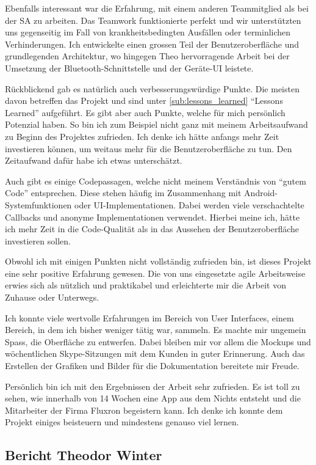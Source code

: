 Ebenfalls interessant war die Erfahrung, mit einem anderen Teammitglied als bei der SA zu arbeiten. Das Teamwork funktionierte perfekt und wir unterstützten uns gegenseitig im Fall von krankheitsbedingten Ausfällen oder terminlichen Verhinderungen. Ich entwickelte einen grossen Teil der Benutzeroberfläche und grundlegenden Architektur, wo hingegen Theo hervorragende Arbeit bei der Umsetzung der Bluetooth-Schnittstelle und der Geräte-UI leistete.

Rückblickend gab es natürlich auch verbesserungswürdige Punkte. Die meisten davon betreffen das Projekt und sind unter \ref{sub:lessons_learned} \enquote{Lessons Learned} aufgeführt. Es gibt aber auch Punkte, welche für mich persönlich Potenzial haben. So bin ich zum Beispiel nicht ganz mit meinem Arbeitsaufwand zu Beginn des Projektes zufrieden. Ich denke ich hätte anfangs mehr Zeit investieren können, um weitaus mehr für die Benutzeroberfläche zu tun. Den Zeitaufwand dafür habe ich etwas unterschätzt.

Auch gibt es einige Codepassagen, welche nicht meinem Verständnis von \enquote{gutem Code} entsprechen. Diese stehen häufig im Zusammenhang mit Android-Systemfunktionen oder UI-Implementationen. Dabei werden viele verschachtelte Callbacks und anonyme Implementationen verwendet. Hierbei meine ich, hätte ich mehr Zeit in die Code-Qualität als in das Aussehen der Benutzeroberfläche investieren sollen.

Obwohl ich mit einigen Punkten nicht vollständig zufrieden bin, ist dieses Projekt eine sehr positive Erfahrung gewesen. Die von uns eingesetzte agile Arbeitsweise erwies sich als nützlich und praktikabel und erleichterte mir die Arbeit von Zuhause oder Unterwegs.

Ich konnte viele wertvolle Erfahrungen im Bereich von User Interfaces, einem Bereich, in dem ich bisher weniger tätig war, sammeln. Es machte mir ungemein Spass, die Oberfläche zu entwerfen. Dabei bleiben mir vor allem die Mockups und wöchentlichen Skype-Sitzungen mit dem Kunden in guter Erinnerung. Auch das Erstellen der Grafiken und Bilder für die Dokumentation bereitete mir Freude.

Persönlich bin ich mit den Ergebnissen der Arbeit sehr zufrieden. Es ist toll zu sehen, wie innerhalb von 14 Wochen eine App aus dem Nichts entsteht und die Mitarbeiter der Firma Fluxron begeistern kann. Ich denke ich konnte dem Projekt einiges beisteuern und mindestens genauso viel lernen.

\subsection{Bericht Theodor Winter}

